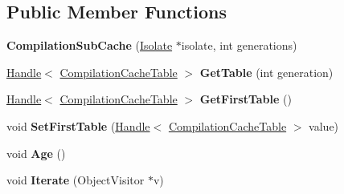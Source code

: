 \subsection*{Public Member Functions}
\begin{DoxyCompactItemize}
\item 
{\bfseries Compilation\+Sub\+Cache} (\hyperlink{classv8_1_1internal_1_1_isolate}{Isolate} $\ast$isolate, int generations)\hypertarget{classv8_1_1internal_1_1_compilation_sub_cache_a33089004169c56ebb3bcb3d52c17da1f}{}\label{classv8_1_1internal_1_1_compilation_sub_cache_a33089004169c56ebb3bcb3d52c17da1f}

\item 
\hyperlink{classv8_1_1internal_1_1_handle}{Handle}$<$ \hyperlink{classv8_1_1internal_1_1_compilation_cache_table}{Compilation\+Cache\+Table} $>$ {\bfseries Get\+Table} (int generation)\hypertarget{classv8_1_1internal_1_1_compilation_sub_cache_a022b165acb35e9396529db1b8890c12b}{}\label{classv8_1_1internal_1_1_compilation_sub_cache_a022b165acb35e9396529db1b8890c12b}

\item 
\hyperlink{classv8_1_1internal_1_1_handle}{Handle}$<$ \hyperlink{classv8_1_1internal_1_1_compilation_cache_table}{Compilation\+Cache\+Table} $>$ {\bfseries Get\+First\+Table} ()\hypertarget{classv8_1_1internal_1_1_compilation_sub_cache_ae3ea21dea1eae5c6a87757a3b22bd580}{}\label{classv8_1_1internal_1_1_compilation_sub_cache_ae3ea21dea1eae5c6a87757a3b22bd580}

\item 
void {\bfseries Set\+First\+Table} (\hyperlink{classv8_1_1internal_1_1_handle}{Handle}$<$ \hyperlink{classv8_1_1internal_1_1_compilation_cache_table}{Compilation\+Cache\+Table} $>$ value)\hypertarget{classv8_1_1internal_1_1_compilation_sub_cache_ae7a8d0f24eed9faee92379512444c68b}{}\label{classv8_1_1internal_1_1_compilation_sub_cache_ae7a8d0f24eed9faee92379512444c68b}

\item 
void {\bfseries Age} ()\hypertarget{classv8_1_1internal_1_1_compilation_sub_cache_a5cce5a7f798869e8f075334d11a04fa5}{}\label{classv8_1_1internal_1_1_compilation_sub_cache_a5cce5a7f798869e8f075334d11a04fa5}

\item 
void {\bfseries Iterate} (Object\+Visitor $\ast$v)\hypertarget{classv8_1_1internal_1_1_compilation_sub_cache_a7dd2c58e4cb9d6404b0d176ce526ad37}{}\label{classv8_1_1internal_1_1_compilation_sub_cache_a7dd2c58e4cb9d6404b0d176ce526ad37}


\end{DoxyCompactItemize}
